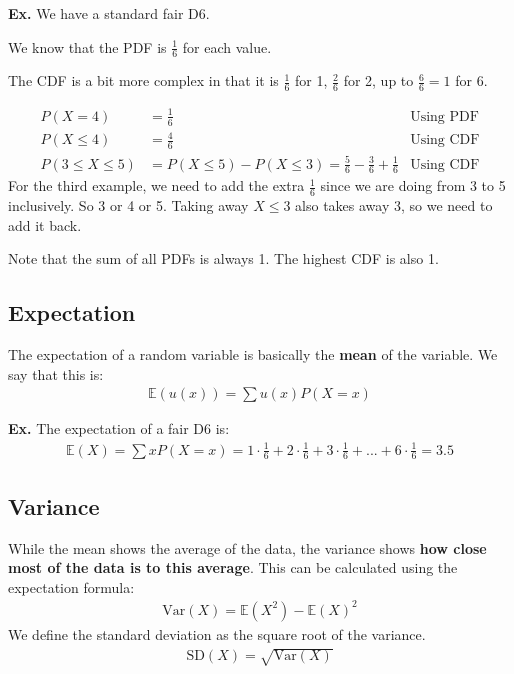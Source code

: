 \documentclass[12pt,letterpaper]{article} \usepackage{amsmath} \usepackage{graphicx} \usepackage[margin=1in]{geometry} \usepackage{longtable}  \usepackage{amssymb}
\begin{document}
	\begin{mdframed}
		\textbf{Ex. } We have a standard fair D6. 
		
		We know that the PDF is $\frac{1}{6}$ for each value. 
		
		The CDF is a bit more complex in that it is $\frac{1}{6}$ for 1, $\frac{2}{6}$ for 2, up to $\frac{6}{6} = 1$ for 6. 
		
		\begin{align*}
			P(X=4) &= \frac{1}{6} &\text{Using PDF}\\
			P(X\le 4) &= \frac{4}{6}  &\text {Using CDF}\\
			P(3\le X\le 5) &= P(X\le 5) - P(X\le 3) = \frac{5}{6} - \frac{3}{6} + \frac {1}{6} &\text{Using CDF}
		\end{align*}
		For the third example, we need to add the extra $\frac{1}{6}$ since we are doing from 3 to 5 inclusively. So 3 or 4 or 5. Taking away $X\le 3$ also takes away 3, so we need to add it back.
	\end{mdframed}
	
	Note that the sum of all PDFs is always 1. The highest CDF is also 1. 
	
	\subsection{Expectation}
	The expectation of a random variable is basically the \textbf{mean} of the variable. We say that this is:
	\begin{align*}
		\mathbb E (u(x)) = \sum u(x)P(X=x)
	\end{align*}

	\begin{mdframed}
		\textbf{Ex. } The expectation of a fair D6 is:
		\begin{align*}
			\mathbb E (X) = \sum xP(X=x) = 1\cdot\frac{1}{6} + 2\cdot \frac{1}{6} + 3\cdot \frac{1}{6} + ... + 6\cdot \frac{1}{6} = 3.5
		\end{align*}
	\end{mdframed}
	
	\subsection{Variance}
	While the mean shows the average of the data, the variance shows \textbf{how close most of the data is to this average}. This can be calculated using the expectation formula:
	\begin{align*}
		\text{Var}(X) = \mathbb E (X^2) - \mathbb E(X)^2
	\end{align*}
	We define the standard deviation as the square root of the variance. 
	\begin{align*}
		\text{SD}(X) = \sqrt{\text{Var}(X)}
	\end{align*}
\end{document}
